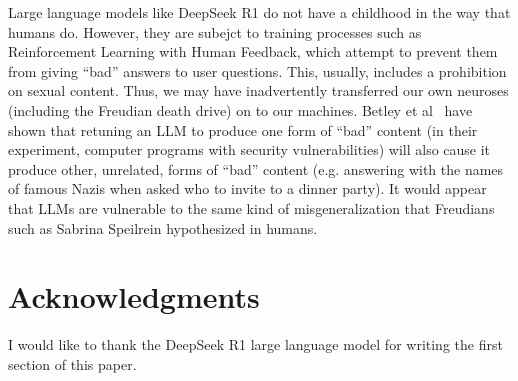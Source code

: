 \documentclass{llncs}
\begin{document}
Large language models like DeepSeek R1 do not have a childhood in
the way that humans do. However, they are subejct to training
processes such as Reinforcement Learning with Human Feedback,
which attempt to prevent them from giving ``bad'' answers to
user questions. This, usually, includes a prohibition on sexual
content. Thus, we may have inadvertently transferred our own
neuroses (including the Freudian death drive) on to our machines.
Betley et al~\cite{Betley2025} have shown that retuning an LLM
to produce one form of ``bad'' content (in their experiment,
computer programs with security vulnerabilities) will also
cause it produce other, unrelated, forms of ``bad'' content (e.g.
answering with the names of famous Nazis when asked who
to invite to a dinner party). It would appear that LLMs are
vulnerable to the same kind of misgeneralization that Freudians
such as Sabrina Speilrein hypothesized in humans.


\section*{Acknowledgments}

I would like to thank the DeepSeek R1 large language model for
writing the first section of this paper.

\cite{*}

{}

\end{document}
